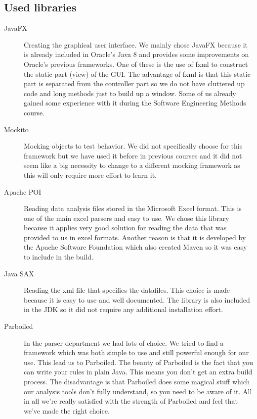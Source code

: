 \documentclass[a4paper]{article}
\begin{document}
\subsection{Used libraries}
\begin{description}

\item[JavaFX] Creating the graphical user interface. We mainly chose JavaFX because it is already included in Oracle's Java 8 and provides some
improvements on Oracle's previous frameworks. One of these is the use of fxml to
construct the static part (view) of the GUI. The advantage of fxml is that this static part is separated from the controller part so we do not have cluttered up code and long methods just to build up a window. Some of us already gained some
experience with it during the Software Engineering Methods course.

\item[Mockito] Mocking objects to test behavior. We did not specifically choose
for this framework but we have used it before in previous courses and it did not
seem like a big necessity to change to a different mocking framework as this
will only require more effort to learn it.

\item[Apache POI] Reading data analysis files stored in the Microsoft Excel
format. This is one of the main excel parsers and easy to use. We chose this
library because it applies very good solution for reading the data that was
provided to us in excel formats. Another reason is that it is developed by the 
Apache Software Foundation which also created Maven so it was easy to include in
the build.

\item[Java SAX] Reading the xml file that specifies the datafiles. This choice is
made because it is easy to use and well documented. The library is also included
in the JDK so it did not require any additional installation effort.

\item[Parboiled] In the parser department we had lots of choice. We tried to find a
framework which was both simple to use and still powerful enough for our use. This lead
us to Parboiled. The beauty of Parboiled is the fact that you can write your rules in
plain Java. This means you don't get an extra build process. The disadvantage is that
Parboiled does some magical stuff which our analysis tools don't fully understand, 
so you need to be aware of it. All in all we're really satisfied with the strength of
Parboiled and feel that we've made the right choice.


\end{description}
\end{document}
